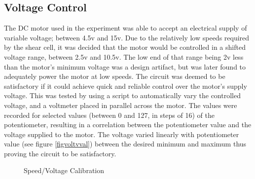 \documentclass[twoside,a4]{report}
\begin{document}
	\subsection*{Voltage Control} %
	The DC motor used in the experiment was able to accept an electrical supply of variable voltage; between 4.5v and 15v. Due to the relatively low speeds required by the shear cell, it was decided that the motor would be controlled in a shifted voltage range, between 2.5v and 10.5v. 
	The low end of that range being 2v less than the motor's minimum voltage was a design artifact, but was later found to adequately power the motor at low speeds. 	%
	The circuit was deemed to be satisfactory if it could achieve quick and reliable control over the motor's supply voltage. This was tested by using a script to automatically vary the controlled voltage, and a voltmeter placed in parallel across the motor. The values were recorded for selected values (between 0 and 127, in steps of 16) of the potentiometer, resulting in a correlation between the potentiometer value and the voltage supplied to the motor. The voltage varied linearly with potentiometer value (see figure \ref{figvoltvval}) between the desired minimum and maximum thus proving the circuit to be satisfactory.
	\begin{figure}[!htb]
		\centering
		\label{figspeecal}
		\caption{Speed/Voltage Calibration}
	\end{figure} \newline  \noindent
\end{document}
